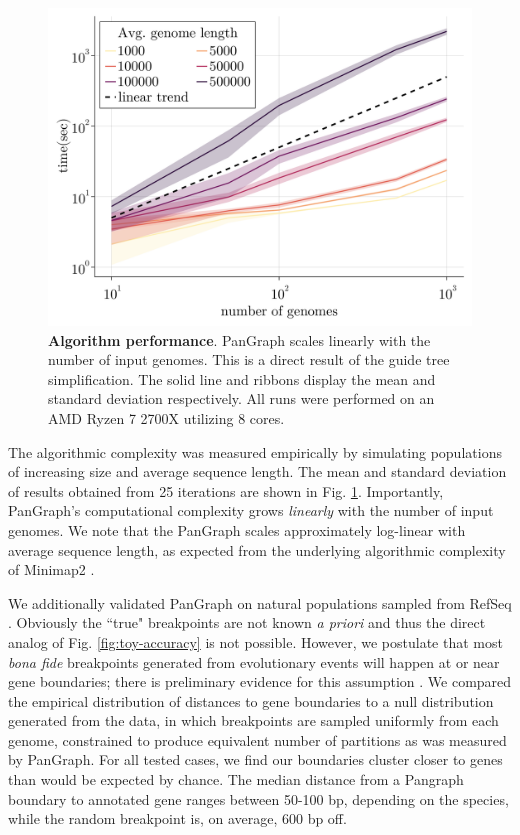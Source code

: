 \documentclass[aps,rmp,reprint,superscriptaddress,notitlepage,10pt]{revtex4-1}
\begin{document}
\begin{figure}[htb]
    \includegraphics[width=.5\textwidth]{benchmark.png}
    \caption{{\bf Algorithm performance}.
        PanGraph scales linearly with the number of input genomes.
        This is a direct result of the guide tree simplification.
        The solid line and ribbons display the mean and standard deviation respectively.
        All runs were performed on an AMD Ryzen 7 2700X utilizing 8 cores.
    }
    \label{fig:toy-performance}
\end{figure}

The algorithmic complexity was measured empirically by simulating populations of increasing size and average sequence length.
The mean and standard deviation of results obtained from 25 iterations are shown in Fig. \ref{fig:toy-performance}.
Importantly, PanGraph's computational complexity grows \emph{linearly} with the number of input genomes.
We note that the PanGraph scales approximately log-linear with average sequence length, as expected from the underlying algorithmic complexity of Minimap2 \cite{li2018minimap2}.

We additionally validated PanGraph on natural populations sampled from RefSeq \cite{o2016reference}.
Obviously the ``true" breakpoints are not known \emph{a priori} and thus the direct analog of Fig. \ref{fig:toy-accuracy} is not possible.
However, we postulate that most \emph{bona fide} breakpoints generated from evolutionary events will happen at or near gene boundaries; there is preliminary evidence for this assumption \cite{oliveira2017chromosomal}.
We compared the empirical distribution of distances to gene boundaries to a null distribution generated from the data, in which breakpoints are sampled uniformly from each genome, constrained to produce equivalent number of partitions as was measured by PanGraph.
For all tested cases, we find our boundaries cluster closer to genes than would be expected by chance.
The median distance from a Pangraph boundary to annotated gene ranges between 50-100 bp, depending on the species, while the random breakpoint is, on average, 600 bp off.
\end{document}
